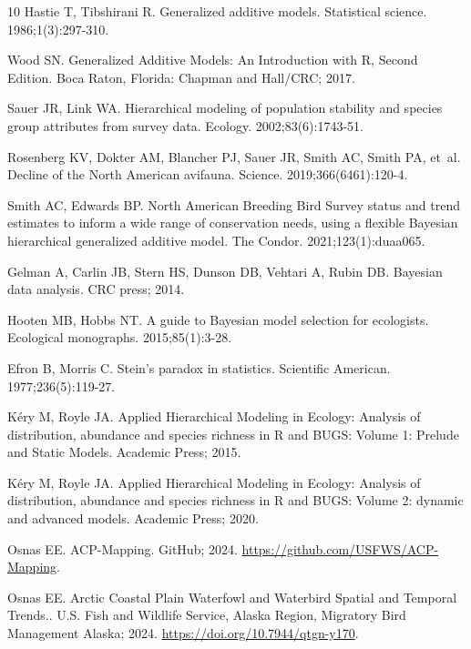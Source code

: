 \documentclass[
  10pt,
  letterpaper,
]{article}
\begin{document}
\begin{thebibliography}{10}
Hastie T, Tibshirani R.
\newblock Generalized additive models.
\newblock Statistical science. 1986;1(3):297-310.

Wood SN.
\newblock Generalized Additive Models: An Introduction with R, Second Edition.
\newblock Boca Raton, Florida: Chapman and Hall/CRC; 2017.

Sauer JR, Link WA.
\newblock Hierarchical modeling of population stability and species group attributes from survey data.
\newblock Ecology. 2002;83(6):1743-51.

Rosenberg KV, Dokter AM, Blancher PJ, Sauer JR, Smith AC, Smith PA, et~al.
\newblock Decline of the North American avifauna.
\newblock Science. 2019;366(6461):120-4.

Smith AC, Edwards BP.
\newblock North American Breeding Bird Survey status and trend estimates to inform a wide range of conservation needs, using a flexible Bayesian hierarchical generalized additive model.
\newblock The Condor. 2021;123(1):duaa065.

Gelman A, Carlin JB, Stern HS, Dunson DB, Vehtari A, Rubin DB.
\newblock Bayesian data analysis.
\newblock CRC press; 2014.

Hooten MB, Hobbs NT.
\newblock A guide to Bayesian model selection for ecologists.
\newblock Ecological monographs. 2015;85(1):3-28.

Efron B, Morris C.
\newblock Stein's paradox in statistics.
\newblock Scientific American. 1977;236(5):119-27.

K{\'e}ry M, Royle JA.
\newblock Applied Hierarchical Modeling in Ecology: Analysis of distribution, abundance and species richness in R and BUGS: Volume 1: Prelude and Static Models.
\newblock Academic Press; 2015.

K{\'e}ry M, Royle JA.
\newblock Applied Hierarchical Modeling in Ecology: Analysis of distribution, abundance and species richness in R and BUGS: Volume 2: dynamic and advanced models.
\newblock Academic Press; 2020.

Osnas EE. ACP-Mapping. GitHub; 2024.
\newblock \url{https://github.com/USFWS/ACP-Mapping}.

Osnas EE. Arctic Coastal Plain Waterfowl and Waterbird Spatial and Temporal Trends.. U.S. Fish and Wildlife Service, Alaska Region, Migratory Bird Management Alaska; 2024.
\newblock \url{https://doi.org/10.7944/qtgn-y170}.


\end{thebibliography}
\end{document}
